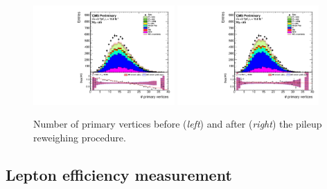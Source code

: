 \begin{figure}[htbp]
	\centering
		\includegraphics[width=0.48\textwidth]{Figures/Results/noPU.pdf}
		\includegraphics[width=0.48\textwidth]{Figures/Results/withPU.pdf}	
	\caption[Number of primary vertices before and after the pileup reweighing procedure.]{Number of primary vertices before (\textit{left}) and after (\textit{right}) the pileup reweighing procedure.}
	\label{fig:N_pu}
\end{figure} 

\subsection{Lepton efficiency measurement}
\label{sec:lepEff}

